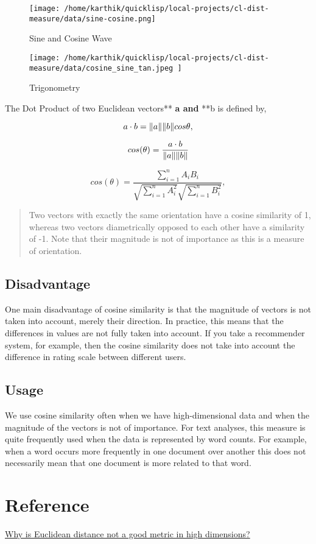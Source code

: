 \documentclass[11pt]{article}
\begin{document}
\begin{figure}[htbp]
\centering
\texttt{[image: /home/karthik/quicklisp/local-projects/cl-dist-measure/data/sine-cosine.png]}
\caption{\label{fig:org531c4fb}Sine and Cosine Wave}
\end{figure}

\begin{figure}[htbp]
\centering
\texttt{[image: /home/karthik/quicklisp/local-projects/cl-dist-measure/data/cosine\_sine\_tan.jpeg ]}
\caption{\label{fig:orgdbea927}Trigonometry}
\end{figure}
The Dot Product of two Euclidean vectors** \textbf{a and} **b is defined by,

$$
a \cdot b = \|a\| \space \|b\| \space cos \theta,
$$

$$
cos(\theta) = \frac{a \cdot b}{\|a\| \space \|b\|}
$$

$$
cos(\theta) = \frac{\displaystyle\sum_{i = 1}^n A_iB_i}{\sqrt{\displaystyle\sum_{i = 1}^n A_i^2}\sqrt{\displaystyle\sum_{i = 1}^n B_i^2}},
$$

\begin{quote}
Two vectors with exactly the same orientation have a cosine similarity
of 1, whereas two vectors diametrically opposed to each other have a
similarity of -1. Note that their magnitude is not of importance as
this is a measure of orientation.
\end{quote}

\subsection{Disadvantage}
\label{sec:org41ad27f}
One main disadvantage of cosine similarity is that the magnitude of
vectors is not taken into account, merely their direction. In practice,
this means that the differences in values are not fully taken into
account. If you take a recommender system, for example, then the cosine
similarity does not take into account the difference in rating scale
between different users.

\subsection{Usage}
\label{sec:org179e488}
We use cosine similarity often when we have high-dimensional data and
when the magnitude of the vectors is not of importance. For text
analyses, this measure is quite frequently used when the data is
represented by word counts. For example, when a word occurs more
frequently in one document over another this does not necessarily mean
that one document is more related to that word.

\section{Reference}
\label{sec:org8e900d5}
\href{https://stats.stackexchange.com/questions/99171/why-is-euclidean-distance-not-a-good-metric-in-high-dimensions}{Why is Euclidean distance not a good metric in high dimensions?}
\end{document}
